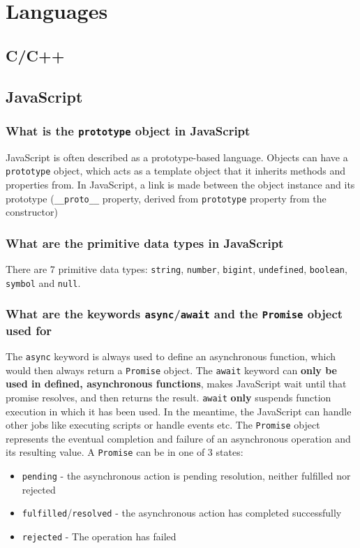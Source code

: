 \documentclass[12pt, a4paper]{article}
\newcommand{\code}[1]{\texttt{#1}}
\begin{document}
\pagebreak
\section*{Languages}

\subsection*{C/C++}


\pagebreak
\subsection*{JavaScript}
\subsubsection*{What is the \code{prototype} object in JavaScript}
JavaScript is often described as a prototype-based language.
Objects can have a \code{prototype} object, which acts as a template object that it inherits methods and properties from.
In JavaScript, a link is made between the object instance and its prototype (\code{\_\_proto\_\_} property, derived from \code{prototype} property from the constructor)

\subsubsection*{What are the primitive data types in JavaScript}
There are 7 primitive data types: \code{string}, \code{number}, \code{bigint}, \code{undefined}, \code{boolean}, \code{symbol} and \code{null}.

\subsubsection*{What are the keywords \code{async}/\code{await} and the \code{Promise} object used for}
The \code{async} keyword is always used to define an asynchronous function, which would then always return a \code{Promise} object.\newline
The \code{await} keyword can \textbf{only be used in defined, asynchronous functions}, makes JavaScript wait until that promise resolves, and then returns the result.
\code{await} \textbf{only} suspends function execution in which it has been used.
In the meantime, the JavaScript can handle other jobs like executing scripts or handle events etc.\newline
The \code{Promise} object represents the eventual completion and failure of an asynchronous operation and its resulting value.
A \code{Promise} can be in one of 3 states:
\begin{itemize}
    \item \code{pending} - the asynchronous action is pending resolution, neither fulfilled nor rejected
    \item \code{fulfilled}/\code{resolved} - the asynchronous action has completed successfully
    \item \code{rejected} - The operation has failed
\end{itemize}
\end{document}
